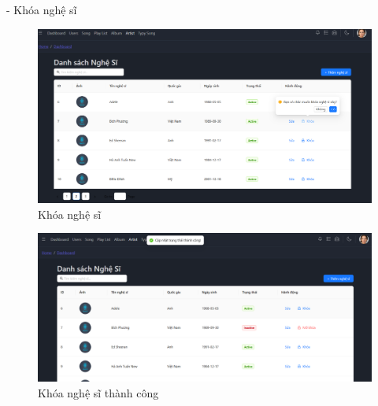- Khóa nghệ sĩ
\begin{figure}[H]
    \centering
    \includegraphics[width=1\textwidth]{imgs/chap5/ql_nghe_si_6.png}
    \caption{Khóa nghệ sĩ}
\end{figure}
\begin{figure}[H]
    \centering
    \includegraphics[width=1\textwidth]{imgs/chap5/ql_nghe_si_7.png}
    \caption{Khóa nghệ sĩ thành công}
\end{figure}

